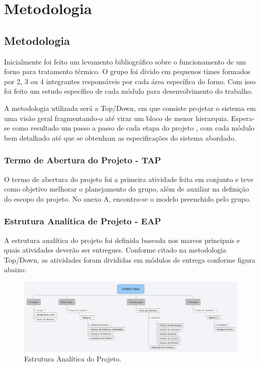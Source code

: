 \part{Metodologia}

\chapter[Metodologia]{Metodologia}

Inicialmente foi feito um levamento bibliográfico sobre o funcionamento de um forno para tratamento térmico. O grupo foi divido em pequenos times formados por 2, 3 ou 4 integrantes responsáveis por cada área específica do forno. Com isso foi feito um estudo específico de cada módulo para desenvolvimento do trabalho.

A metodologia utilizada será a Top/Down, em que consiste projetar o sistema em uma visão geral fragmentando-o até virar um bloco de menor hierarquia. Espera-se como resultado um passo a passo de cada etapa do projeto , com cada módulo bem detalhado até que se obtenham as especificações do sistema abordado.


\section{Termo de Abertura do Projeto - TAP}

O termo de abertura do projeto foi a primeira atividade feita em conjunto e teve como objetivo melhorar o planejamento do grupo, além de auxiliar na definição do escopo do projeto. No anexo A, encontra-se o modelo preenchido pelo grupo.

\section{Estrutura Analítica de Projeto - EAP}

A estrutura analítica do projeto foi definida baseada nos marcos principais e quais atividades deverão ser entregues.  Conforme citado na metodologia Top/Down, as atividades foram divididas em módulos de entrega conforme figura abaixo:

\begin{figure}[!h]
	\centering
	\label{eap}
	\includegraphics[keepaspectratio=true,scale=0.3]{figuras/eap.jpg}
	\caption{Estrutura Analítica do Projeto.}
\end{figure}

